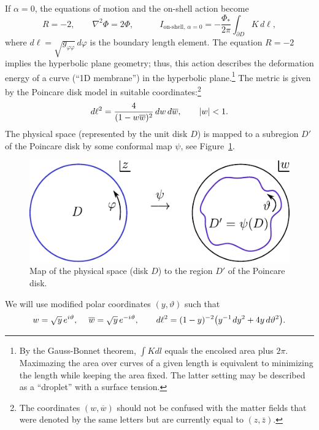 \documentclass[12pt]{article}
\newcommand{\vt}{\vartheta}
\newcommand{\vp}{\varphi}
\newcommand{\wc}{\overline{w}}
\begin{document}
If $\alpha=0$, the equations of motion and the on-shell action become
\begin{equation}
R = -2,\qquad \nabla^2 \Phi= 2 \Phi,\qquad\quad
I_{\text{on-shell},\,\alpha=0}
=-\frac{\Phi_*}{2\pi}\int_{\partial D} K\,d\ell,
\end{equation}
where $d\ell=\sqrt{g_{\vp\vp}}\,d\vp$ is the boundary length element. The equation $R=-2$ implies the hyperbolic plane geometry; thus, this action describes the deformation energy of a curve (``1D membrane'') in the hyperbolic plane.\footnote{By the Gauss-Bonnet theorem, $\int Kdl$ equals the encolsed area plus $2\pi$. Maximazing the area over curves of a given length is equivalent to minimizing the length while keeping the area fixed. The latter setting may be described as a ``droplet'' with a surface tension.} The metric is given by the Poincare disk model in suitable coordinates:\footnote{The coordinates $(w,\wc)$ should not be confused with the matter fields that were denoted by the same letters but are currently equal to $(z,\bar{z})$.}
\begin{equation} \label{Pdisk}
d\ell^2=\frac{4}{(1- w \wc)^2}\,dw\, d\wc, \qquad  \abs{w}<1.
\end{equation}
The physical space (represented by the unit disk $D$) is mapped to a subregion $D'$ of the Poincare disk by some conformal map $\psi$, see Figure~\ref{fig: psimap}.
\begin{figure}
\centerline{\includegraphics[scale=1.0]{psimap}}
\caption{Map of the physical space (disk $D$) to the region $D'$ of the Poincare disk.}\label{fig: psimap}
\end{figure}
We will use modified polar coordinates $(y,\vt)$ such that
\begin{equation}\label{yvt_coord}
w=\sqrt{y}\,e^{i\vt}, \quad\: \wc=\sqrt{y}\,e^{-i\vt},\qquad
d\ell^2=(1-y)^{-2}\bigl(y^{-1}\kern1pt dy^2+4y\,d\vt^2\bigr).
\end{equation}
\end{document}
